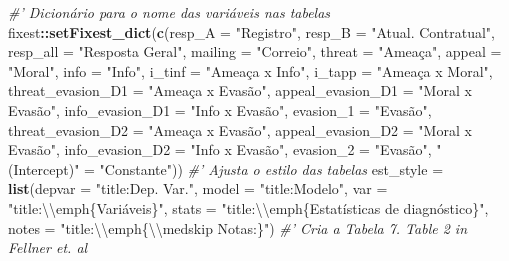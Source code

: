\documentclass[
]{article}
\newenvironment{Shaded}{\begin{snugshade}}{\end{snugshade}}
\newcommand{\CharTok}[1]{\textcolor[rgb]{0.31,0.60,0.02}{#1}}
\newcommand{\CommentTok}[1]{\textcolor[rgb]{0.56,0.35,0.01}{\textit{#1}}}
\newcommand{\DataTypeTok}[1]{\textcolor[rgb]{0.13,0.29,0.53}{#1}}
\newcommand{\KeywordTok}[1]{\textcolor[rgb]{0.13,0.29,0.53}{\textbf{#1}}}
\newcommand{\NormalTok}[1]{#1}
\newcommand{\OperatorTok}[1]{\textcolor[rgb]{0.81,0.36,0.00}{\textbf{#1}}}
\newcommand{\StringTok}[1]{\textcolor[rgb]{0.31,0.60,0.02}{#1}}
\begin{document}
\begin{Shaded}
\begin{Highlighting}[]
{{{{{{{{{{{{{{{{{{{{{{{{{{{{{{{{{{{{{{{{{{{{{{{{{{{{{{{{{{\CommentTok{#' Dicionário para o nome das variáveis nas tabelas}
\NormalTok{fixest}\OperatorTok{::}\KeywordTok{setFixest_dict}\NormalTok{(}\KeywordTok{c}\NormalTok{(}\DataTypeTok{resp_A =} \StringTok{"Registro"}\NormalTok{, }
                         \DataTypeTok{resp_B =} \StringTok{"Atual. Contratual"}\NormalTok{, }
                         \DataTypeTok{resp_all =} \StringTok{"Resposta Geral"}\NormalTok{,}
                         \DataTypeTok{mailing =} \StringTok{"Correio"}\NormalTok{,}
                         \DataTypeTok{threat =} \StringTok{"Ameaça"}\NormalTok{,}
                         \DataTypeTok{appeal =} \StringTok{"Moral"}\NormalTok{,}
                         \DataTypeTok{info =} \StringTok{"Info"}\NormalTok{,}
                         \DataTypeTok{i_tinf =} \StringTok{"Ameaça x Info"}\NormalTok{,}
                         \DataTypeTok{i_tapp =} \StringTok{"Ameaça x Moral"}\NormalTok{,}
                         \DataTypeTok{threat_evasion_D1 =} \StringTok{"Ameaça x Evasão"}\NormalTok{,}
                         \DataTypeTok{appeal_evasion_D1 =} \StringTok{"Moral x Evasão"}\NormalTok{,}
                         \DataTypeTok{info_evasion_D1 =} \StringTok{"Info x Evasão"}\NormalTok{,}
                         \DataTypeTok{evasion_1 =} \StringTok{"Evasão"}\NormalTok{,}
                         \DataTypeTok{threat_evasion_D2 =} \StringTok{"Ameaça x Evasão"}\NormalTok{,}
                         \DataTypeTok{appeal_evasion_D2 =} \StringTok{"Moral x Evasão"}\NormalTok{,}
                         \DataTypeTok{info_evasion_D2 =} \StringTok{"Info x Evasão"}\NormalTok{,}
                         \DataTypeTok{evasion_2 =} \StringTok{"Evasão"}\NormalTok{,}
                         \StringTok{"(Intercept)"}\NormalTok{ =}\StringTok{ "Constante"}\NormalTok{))}
\CommentTok{#' Ajusta o estilo das tabelas}
\NormalTok{est_style =}\StringTok{ }\KeywordTok{list}\NormalTok{(}\DataTypeTok{depvar =} \StringTok{"title:Dep. Var."}\NormalTok{,}
                 \DataTypeTok{model =} \StringTok{"title:Modelo"}\NormalTok{,}
                 \DataTypeTok{var =} \StringTok{"title:}\CharTok{\textbackslash{}\textbackslash{}}\StringTok{emph\{Variáveis\}"}\NormalTok{,}
                 \DataTypeTok{stats =} \StringTok{"title:}\CharTok{\textbackslash{}\textbackslash{}}\StringTok{emph\{Estatísticas de diagnóstico\}"}\NormalTok{,}
                 \DataTypeTok{notes =} \StringTok{"title:}\CharTok{\textbackslash{}\textbackslash{}}\StringTok{emph\{}\CharTok{\textbackslash{}\textbackslash{}}\StringTok{medskip Notas:\}"}\NormalTok{)}
\CommentTok{#' Cria a Tabela 7. Table 2 in Fellner et. al}
}}}}}}}}}}}}}}}}}}}}}}}}}}}}}}}}}}}}}}}}}}}}}}}}}}}}}}}}}}
\end{Highlighting}
\end{Shaded}
\end{document}
